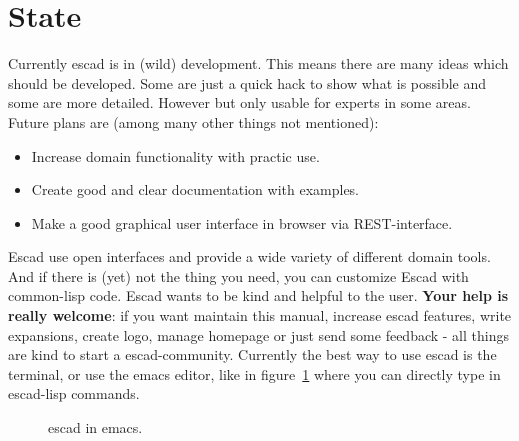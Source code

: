 \documentclass[a4paper, 12pt, openany]{scrbook}
\begin{document}
\section{State}
Currently escad is in (wild) development. This means there are many ideas which should be developed. Some are just a quick hack to show what is possible and some are more detailed. However but only usable for experts in some areas.
Future plans are (among many other things not mentioned):
\begin{itemize}
\item Increase domain functionality with practic use.
\item Create good and clear documentation with examples.
\item Make a good graphical user interface in browser via REST-interface.
\end{itemize}
Escad use open interfaces and provide a wide variety of different domain tools. And if there is (yet) not the thing you need, you can customize Escad with common-lisp code. Escad wants to be kind and helpful to the user. \textbf{Your help is really welcome}: if you want maintain this manual, increase escad features, write expansions, create logo, manage homepage or just send some feedback - all things are kind to start a escad-community. Currently the best way to use escad is the terminal, or use the emacs editor, like in figure~\ref{fig:escad_emacs} where you can directly type in escad-lisp commands.
\begin{figure}[htbp]
  \centering
  \caption{escad in emacs.}
  \label{fig:escad_emacs}
\end{figure}
\end{document}
